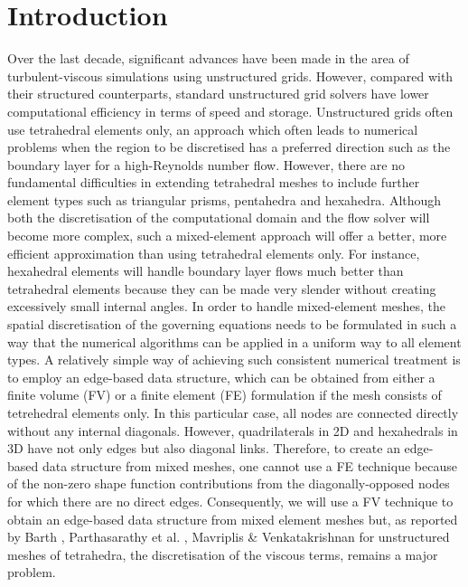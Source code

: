 %
%
%
%
%
\section{Introduction}
\label{intro_nonlinear.sec}
%
 Over the last decade, significant advances have been made
 in the area of turbulent-viscous simulations using unstructured
 grids.
 However, compared with their structured counterparts,
 standard unstructured grid solvers have lower computational
 efficiency in terms of speed and storage.
 Unstructured grids often use tetrahedral elements only,
 an approach which often leads to numerical problems when the region to be
 discretised has a preferred direction such as the boundary layer for a
 high-Reynolds number flow. However, there are no fundamental difficulties in 
 extending tetrahedral meshes to include further element types such as triangular prisms, 
 pentahedra and hexahedra.  
 Although both the discretisation of the computational domain and the flow solver
 will become more complex,  such a mixed-element approach will offer
 a better, more efficient approximation than using tetrahedral elements only.
 For instance, hexahedral elements will handle boundary layer flows much better
 than tetrahedral elements because they can be made very slender without
 creating excessively small internal angles. 
 In order to handle mixed-element meshes, the spatial discretisation
 of the governing equations needs to be formulated in such a way
 that the numerical algorithms can be applied in a uniform way to all
 element types.
 A relatively simple way of achieving such consistent numerical treatment
 is to employ an edge-based data structure, which can be obtained
 from either a finite volume (FV) or a finite element (FE) formulation
 if the mesh consists of tetrehedral elements only. In this particular case, 
 all nodes are connected directly without any internal diagonals.
 However, quadrilaterals in 2D and hexahedrals in 3D have not only
 edges but also diagonal links. Therefore, to create an edge-based
 data structure from mixed meshes, one cannot use a FE technique
 because of the non-zero shape function contributions from the
 diagonally-opposed nodes for which there are no direct edges.
 Consequently, we will use a FV technique to obtain an edge-based
 data structure from mixed element meshes but, as reported by
 Barth \citeyear{Barth:4}, Parthasarathy et al. \citeyear{Kallinderis:2},
 Mavriplis \& Venkatakrishnan \citeyear{Mavriplis:3}
 for unstructured meshes of tetrahedra, 
 the discretisation of the viscous terms, remains a major problem. 
